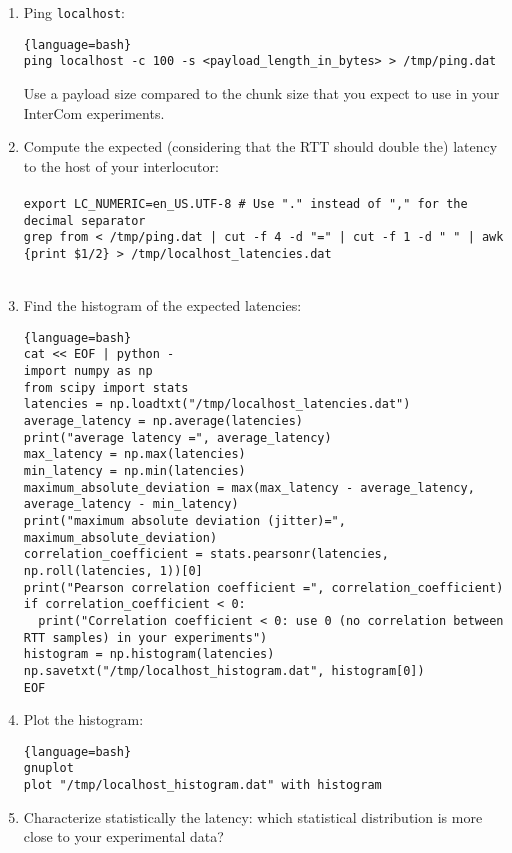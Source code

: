 \begin{enumerate}
\item Ping \texttt{localhost}:
   \begin{lstlisting}{language=bash}
ping localhost -c 100 -s <payload_length_in_bytes> > /tmp/ping.dat
  \end{lstlisting}
  Use a payload size compared to the chunk size that you expect to use
  in your InterCom experiments.
\item Compute the expected (considering that the RTT should
  double the) latency to the host of your interlocutor:\\\\
  \texttt{export LC\_NUMERIC=en\_US.UTF-8 \# Use "." instead of "," for the decimal separator}\\
\texttt{grep from < /tmp/ping.dat | cut -f 4 -d "=" | cut -f 1 -d " " | awk
  \textquotesingle\{print \$1/2\}\textquotesingle~> /tmp/localhost\_latencies.dat}\\\\

\item Find the histogram of the expected latencies:
  
  \begin{lstlisting}{language=bash}
cat << EOF | python -
import numpy as np
from scipy import stats
latencies = np.loadtxt("/tmp/localhost_latencies.dat")
average_latency = np.average(latencies)
print("average latency =", average_latency)
max_latency = np.max(latencies)
min_latency = np.min(latencies)
maximum_absolute_deviation = max(max_latency - average_latency, average_latency - min_latency)
print("maximum absolute deviation (jitter)=", maximum_absolute_deviation)
correlation_coefficient = stats.pearsonr(latencies, np.roll(latencies, 1))[0]
print("Pearson correlation coefficient =", correlation_coefficient)
if correlation_coefficient < 0:
  print("Correlation coefficient < 0: use 0 (no correlation between RTT samples) in your experiments")
histogram = np.histogram(latencies)
np.savetxt("/tmp/localhost_histogram.dat", histogram[0])
EOF
  \end{lstlisting}

\item Plot the histogram:
  \begin{lstlisting}{language=bash}
gnuplot
plot "/tmp/localhost_histogram.dat" with histogram
  \end{lstlisting}
  
\item Characterize statistically the latency: which statistical
  distribution is more close to your experimental data?
\end{enumerate}


